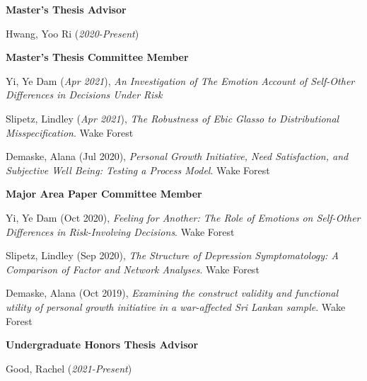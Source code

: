 {\large\textbf{Master's Thesis Advisor}}
\begin{etaremune}%
\item Hwang, Yoo Ri (\textit{2020-Present})
\end{etaremune}%

{\large\textbf{Master's Thesis Committee Member}}
\begin{etaremune}%
\item Yi, Ye Dam (\textit{Apr 2021}), \textit{An Investigation of The Emotion Account of Self-Other Differences in Decisions Under Risk}
\item  Slipetz, Lindley (\textit{Apr 2021}), \textit{The Robustness of Ebic Glasso to Distributional Misspecification}. Wake Forest
\item Demaske, Alana (Jul 2020), \textit{Personal Growth Initiative, Need Satisfaction, and Subjective Well Being: Testing a Process Model}. Wake Forest%
\end{etaremune}%
%
{\large\textbf{Major Area Paper Committee Member}}
\begin{etaremune}%
\item Yi, Ye Dam (Oct 2020), \textit{Feeling for Another: The Role of Emotions on Self-Other Differences in Risk-Involving Decisions}. Wake Forest%
\item Slipetz, Lindley (Sep 2020), \textit{The Structure of Depression Symptomatology: A Comparison of Factor and Network Analyses}. Wake Forest%
\item Demaske, Alana (Oct 2019), \textit{Examining the construct validity and functional utility of personal growth initiative in a war-affected Sri Lankan sample}. Wake Forest%
\end{etaremune}%
%
{\large\textbf{Undergraduate Honors Thesis Advisor}}
\begin{etaremune}%
\item Good, Rachel (\textit{2021-Present})
\end{etaremune}%

